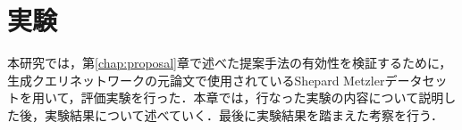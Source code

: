 \chapter{実験}
\label{chap:experiment}
本研究では，第\ref{chap:proposal}章で述べた提案手法の有効性を検証するために，生成クエリネットワークの元論文で使用されているShepard Metzlerデータセットを用いて，評価実験を行った．本章では，行なった実験の内容について説明した後，実験結果について述べていく．最後に実験結果を踏まえた考察を行う．

